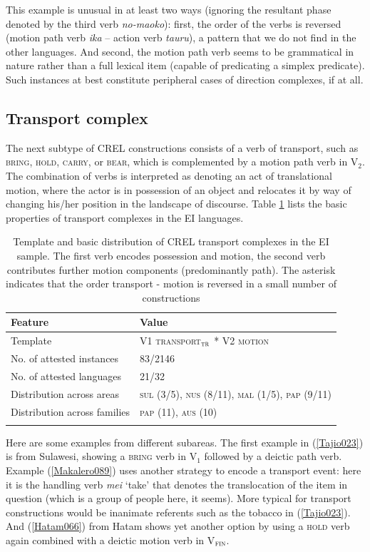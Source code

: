 This example is unusual in at least two ways (ignoring the resultant phase denoted by the third verb \textit{no-maoko}): first, the order of the verbs is reversed (motion path verb \textit{ika} -- action verb \textit{tauru}), a pattern that we do not find in the other languages. And second, the motion path verb seems to be grammatical in nature rather than a full lexical item (capable of predicating a simplex predicate). Such instances at best constitute peripheral cases of direction complexes, if at all.

\subsection{Transport complex} \label{sec:transport}

The next subtype of CREL constructions consists of a verb of transport, such as \textsc{bring}, \textsc{hold}, \textsc{carry}, or \textsc{bear}, which is complemented by a motion path verb in V$_2$. The combination of verbs is interpreted as denoting an act of translational motion, where the actor is in possession of an object and relocates it by way of changing his/her position in the landscape of discourse. Table \ref{table:basiccreltransport} lists the basic properties of transport complexes in the EI languages. 

\begin{table}
\begin{tabular}{ll}
\lsptoprule
Feature&Value\tabularnewline
\midrule
Template&V1 \textsc{transport$_{\textsc{tr}}$} * V2 \textsc{motion}\tabularnewline
No. of attested instances& 83/2146 \tabularnewline
No. of attested languages& 21/32 \tabularnewline
Distribution across areas& \textsc{sul} (3/5), \textsc{nus} (8/11), \textsc{mal} (1/5), \textsc{pap} (9/11) \tabularnewline
Distribution across families& \textsc{pap} (11), \textsc{aus} (10) \tabularnewline
\lspbottomrule
\end{tabular}
\caption[Template and basic distribution of CREL transport complexes]{Template and basic distribution of CREL transport complexes in the EI sample. The first verb encodes possession and motion, the second verb contributes further motion components (predominantly path). The asterisk indicates that the order transport - motion is reversed in a small number of constructions}
\label{table:basiccreltransport}
\end{table}

Here are some examples from different subareas. The first example in (\ref{Tajio023}) is from Sulawesi, showing a \textsc{bring} verb in V$_{1}$ followed by a deictic path verb. Example (\ref{Makalero089}) uses another strategy to encode a transport event: here it is the handling verb \textit{mei} `take' that denotes the translocation of the item in question (which is a group of people here, it seems). More typical for transport constructions would be inanimate referents such as the tobacco in (\ref{Tajio023}). And (\ref{Hatam066}) from Hatam shows yet another option by using a \textsc{hold} verb again combined with a deictic motion verb in V$_{\textsc{fin}}$.

